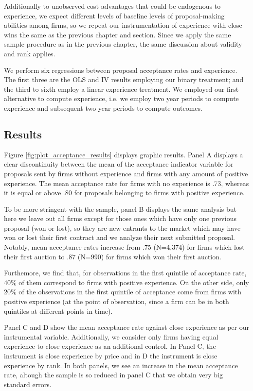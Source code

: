 Additionally to unobserved cost advantages that could be endogenous to experience, we expect different levels of baseline levels of proposal-making abilities among firms, so we repeat our instrumentation of experience with close wins the same as the previous chapter and section. Since we apply the same sample procedure as in the previous chapter, the same discussion about validity and rank applies.

We perform six regressions between proposal acceptance rates and experience. The first three are the OLS and IV results employing our binary treatment; and the third to sixth employ a linear experience treatment. We employed our first alternative to compute experience, i.e. we employ two year periods to compute experience and subsequent two year periods to compute outcomes.

\subsection{Results}
Figure \ref{fig:plot_acceptance_results} displays graphic results. Panel A displays a clear discontinuity between the mean of the acceptance indicator variable for proposals sent by firms without experience and firms with any amount of positive experience. The mean acceptance rate for firms with no experience is .73, whereas it is equal or above .80 for proposals belonging to firms with positive experience.

 To be more stringent with the sample, panel B displays the same analysis but here we leave out all firms except for those ones which have only one previous proposal (won or lost), so they are new entrants to the market which may have won or lost their first contract and we analyze their next submitted proposal.  Notably, mean acceptance rates increase from .75 (N=4,374) for firms which lost their first auction to .87 (N=990) for firms which won their first auction.

Furthemore, we find that, for observations in the first quintile of acceptance rate, 40\% of them correspond to firms with positive experience. On the other side, only 20\% of the observations in the first quintile of acceptance come from firms with positive experience (at the point of observation, since a firm can be in both quintiles at different points in time).

Panel C and D show the mean acceptance rate against close experience as per our instrumental variable. Additionally, we consider only firms having equal experience to close experience as an additional control. In Panel C, the instrument is close experience by price and in D the instrument is close experience by rank. In both panels, we see an increase in the mean acceptance rate, altough the sample is so reduced in panel C that we obtain very big standard errors.

